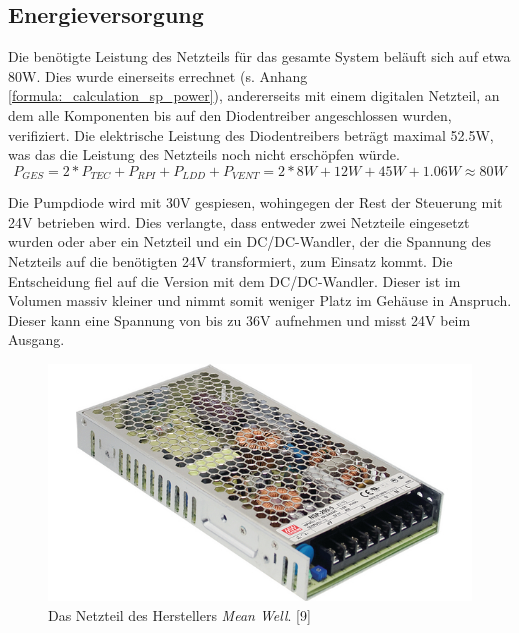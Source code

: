 \subsection{Energieversorgung}
Die benötigte Leistung des Netzteils für das gesamte System beläuft sich auf etwa 80W. Dies wurde einerseits errechnet (s. Anhang \ref{formula:_calculation_sp_power}), andererseits mit einem digitalen Netzteil, an dem alle Komponenten bis auf den Diodentreiber angeschlossen wurden, verifiziert. Die elektrische Leistung des Diodentreibers beträgt maximal 52.5W, was das die Leistung des Netzteils noch nicht erschöpfen würde.\\
\begin{equation}
P_{GES} = 2*P_{TEC}+P_{RPI}+P_{LDD}+P_{VENT} = 2*8W+12W+45W+1.06W \approx 80W
    \label{formula:_calculation_sp_power}
\end{equation}

Die Pumpdiode wird mit 30V gespiesen, wohingegen der Rest der Steuerung mit 24V betrieben wird. Dies verlangte, dass entweder zwei Netzteile eingesetzt wurden oder aber ein Netzteil und ein DC/DC-Wandler, der die Spannung des Netzteils auf die benötigten 24V transformiert, zum Einsatz kommt. Die Entscheidung fiel auf die Version mit dem DC/DC-Wandler. Dieser ist im Volumen massiv kleiner und nimmt somit weniger Platz im Gehäuse in Anspruch. Dieser kann eine Spannung von bis zu 36V aufnehmen und misst 24V beim Ausgang.

\begin{figure}[H]
    \centering
    \includegraphics[scale=0.35]{98_images/schaltnetzteile-200-w-pfc.jpg}
    \caption{Das Netzteil des Herstellers \textit{Mean Well}. [9]}
    \label{fig:controller_ps_hw}
\end{figure}

